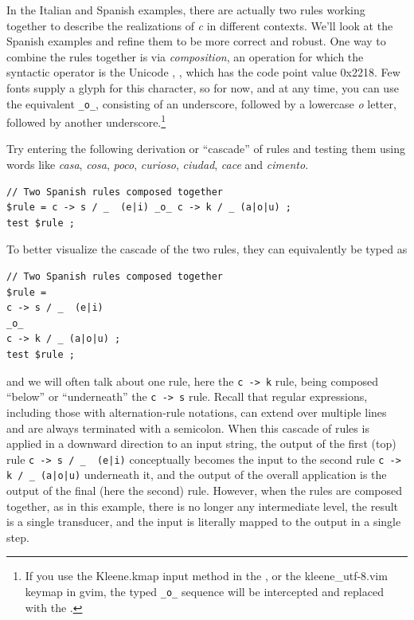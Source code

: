 In the Italian and Spanish examples, there are actually two rules working together to describe the realizations of
\emph{c} in different contexts.  We'll look at the Spanish examples and refine them to be more correct and robust.  One
way to combine the rules together is via \emph{composition}, an
operation for which the syntactic 
operator is the Unicode , \ringop{}, which
has the code point value 0x2218.  Few fonts supply a glyph for this
character, so for now, and at any time, you can use
the  equivalent \verb!_o_!, consisting of an
underscore, followed by a lowercase \emph{o} letter, followed by another underscore.\footnote{If you use the
	Kleene.kmap input method in the , or the kleene\_utf-8.vim
	keymap in gvim, the typed \verb!_o_! sequence will be
intercepted and replaced with the  \ringop{}.}

Try entering the following derivation or ``cascade'' of rules and testing them using words like \emph{casa},
\emph{cosa}, \emph{poco}, \emph{curioso}, \emph{ciudad}, \emph{cace} and \emph{cimento}.


\begin{Verbatim}
// Two Spanish rules composed together
$rule = c -> s / _  (e|i) _o_ c -> k / _ (a|o|u) ;
test $rule ;
\end{Verbatim}

\noindent
To better visualize the cascade of the two rules, they can equivalently be typed as

\begin{Verbatim}
// Two Spanish rules composed together
$rule = 
c -> s / _  (e|i) 
_o_ 
c -> k / _ (a|o|u) ;
test $rule ;
\end{Verbatim}

\noindent
and we will often talk about one rule, here the \texttt{c -> k} rule,
being composed ``below'' or
``underneath'' the \texttt{c -> s} rule.  Recall that regular
expressions, including those with alternation-rule notations, can extend
over multiple lines and are always terminated with a semicolon.  When this cascade of rules is applied in a downward direction to an input
string, the output of the first (top) rule \verb!c -> s / _  (e|i)!
conceptually becomes the input to the second rule
\verb!c -> k / _ (a|o|u)!
underneath it, and the output of the overall application is the output of the
final (here the second) rule.  However, when the rules are composed
together, as in this example, there is no longer any intermediate level,
the result is a single transducer, and the input is literally mapped to the output
in a single step.

